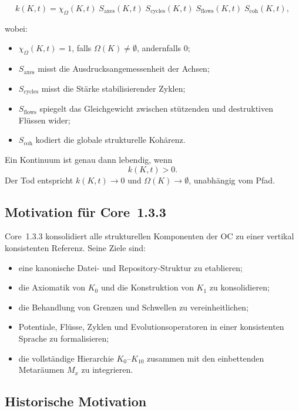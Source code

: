 \[
k(K,t) =
\chi_{\Omega}(K,t)\;
S_{\mathrm{axes}}(K,t)\;
S_{\mathrm{cycles}}(K,t)\;
S_{\mathrm{flows}}(K,t)\;
S_{\mathrm{coh}}(K,t),
\]

wobei:

\begin{itemize}
    \item \(\chi_{\Omega}(K,t)=1\), falls \(\Omega(K)\neq\emptyset\), andernfalls \(0\);
    \item \(S_{\mathrm{axes}}\) misst die Ausdrucksangemessenheit der Achsen;
    \item \(S_{\mathrm{cycles}}\) misst die Stärke stabilisierender Zyklen;
    \item \(S_{\mathrm{flows}}\) spiegelt das Gleichgewicht zwischen stützenden und destruktiven Flüssen wider;
    \item \(S_{\mathrm{coh}}\) kodiert die globale strukturelle Kohärenz.
\end{itemize}

Ein Kontinuum ist genau dann lebendig, wenn
\[
k(K,t) > 0.
\]
Der Tod entspricht \(k(K,t)\to 0\) und \(\Omega(K)\to\emptyset\), unabhängig vom Pfad.

\subsection{Motivation für Core~1.3.3}

Core~1.3.3 konsolidiert alle strukturellen Komponenten der OC zu einer vertikal konsistenten Referenz.
Seine Ziele sind:

\begin{itemize}
    \item eine kanonische Datei- und Repository-Struktur zu etablieren;
    \item die Axiomatik von \(K_0\) und die Konstruktion von \(K_1\) zu konsolidieren;
    \item die Behandlung von Grenzen und Schwellen zu vereinheitlichen;
    \item Potentiale, Flüsse, Zyklen und Evolutionsoperatoren in einer konsistenten Sprache zu formalisieren;
    \item die vollständige Hierarchie \(K_0\)–\(K_{10}\) zusammen mit den einbettenden Metaräumen \(M_x\) zu integrieren.
\end{itemize}

\subsection{Historische Motivation}

